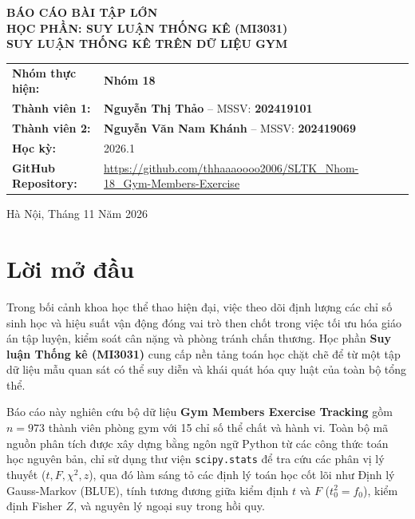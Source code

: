 \documentclass[12pt,a4paper]{report}
\begin{document}
\begin{titlepage}
\begin{center}
    \vspace*{1.5cm}
    {\Large\bfseries BÁO CÁO BÀI TẬP LỚN}\\[10pt]
    {\Large\bfseries HỌC PHẦN: SUY LUẬN THỐNG KÊ (MI3031)}\\[30pt]

    {\huge\bfseries SUY LUẬN THỐNG KÊ TRÊN DỮ LIỆU GYM}\\[40pt]

    \begin{minipage}{0.85\textwidth}
        \begin{tabular}{ll}
            \textbf{Nhóm thực hiện:} & \textbf{Nhóm 18} \\[6pt]
            \textbf{Thành viên 1:} & \textbf{Nguyễn Thị Thảo} -- MSSV: \textbf{202419101} \\
            \textbf{Thành viên 2:} & \textbf{Nguyễn Văn Nam Khánh} -- MSSV: \textbf{202419069} \\[6pt]
            \textbf{Học kỳ:} & 2026.1 \\[6pt]
            \textbf{GitHub Repository:} & \url{https://github.com/thhaaaoooo2006/SLTK_Nhom-18_Gym-Members-Exercise}
        \end{tabular}
    \end{minipage}

    \vfill
    {\large Hà Nội, Tháng 11 Năm 2026}
\end{center}
\end{titlepage}

\tableofcontents
\newpage
{}

\chapter*{Lời mở đầu}
Trong bối cảnh khoa học thể thao hiện đại, việc theo dõi định lượng các chỉ số sinh học và hiệu suất vận động đóng vai trò then chốt trong việc tối ưu hóa giáo án tập luyện, kiểm soát cân nặng và phòng tránh chấn thương. Học phần \textbf{Suy luận Thống kê (MI3031)} cung cấp nền tảng toán học chặt chẽ để từ một tập dữ liệu mẫu quan sát có thể suy diễn và khái quát hóa quy luật của toàn bộ tổng thể.

Báo cáo này nghiên cứu bộ dữ liệu \textbf{Gym Members Exercise Tracking} gồm $n = 973$ thành viên phòng gym với 15 chỉ số thể chất và hành vi. Toàn bộ mã nguồn phân tích được xây dựng bằng ngôn ngữ Python từ các công thức toán học nguyên bản, chỉ sử dụng thư viện \texttt{scipy.stats} để tra cứu các phân vị lý thuyết ($t, F, \chi^2, z$), qua đó làm sáng tỏ các định lý toán học cốt lõi như Định lý Gauss-Markov (BLUE), tính tương đương giữa kiểm định $t$ và $F$ ($t_0^2 = f_0$), kiểm định Fisher $Z$, và nguyên lý ngoại suy trong hồi quy.
\end{document}
